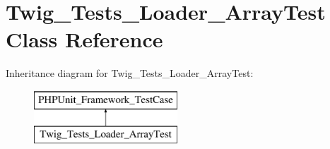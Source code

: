 \hypertarget{classTwig__Tests__Loader__ArrayTest}{}\section{Twig\+\_\+\+Tests\+\_\+\+Loader\+\_\+\+Array\+Test Class Reference}
\label{classTwig__Tests__Loader__ArrayTest}
Inheritance diagram for Twig\+\_\+\+Tests\+\_\+\+Loader\+\_\+\+Array\+Test\+:\begin{figure}[H]
\begin{center}
\leavevmode
\includegraphics[height=2.000000cm]{classTwig__Tests__Loader__ArrayTest}
\end{center}
\end{figure}
